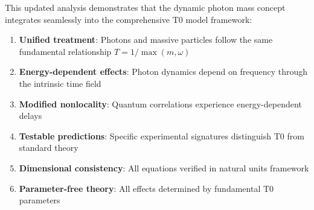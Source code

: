 \documentclass[12pt,a4paper]{article}
\begin{document}
	This updated analysis demonstrates that the dynamic photon mass concept integrates seamlessly into the comprehensive T0 model framework:
	
	\begin{enumerate}
		\item \textbf{Unified treatment}: Photons and massive particles follow the same fundamental relationship $T = 1/\max(m,\omega)$
		\item \textbf{Energy-dependent effects}: Photon dynamics depend on frequency through the intrinsic time field
		\item \textbf{Modified nonlocality}: Quantum correlations experience energy-dependent delays
		\item \textbf{Testable predictions}: Specific experimental signatures distinguish T0 from standard theory
		\item \textbf{Dimensional consistency}: All equations verified in natural units framework
		\item \textbf{Parameter-free theory}: All effects determined by fundamental T0 parameters
	\end{enumerate}
	
\end{document}
